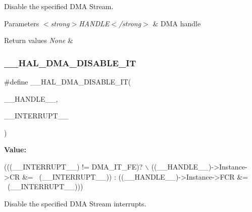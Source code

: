 Disable the specified D\+MA Stream. 


\begin{DoxyParams}{Parameters}
{\em $<$strong$>$\+H\+A\+N\+D\+L\+E$<$/strong$>$} & D\+MA handle \\
\hline
\end{DoxyParams}

\begin{DoxyRetVals}{Return values}
{\em None} & \\
\hline
\end{DoxyRetVals}
\mbox{\label{group___d_m_a_ga2867eab09398df2daac55c3f327654da}} 
\subsubsection{\texorpdfstring{\+\_\+\+\_\+\+H\+A\+L\+\_\+\+D\+M\+A\+\_\+\+D\+I\+S\+A\+B\+L\+E\+\_\+\+IT}{\_\_HAL\_DMA\_DISABLE\_IT}}
{\footnotesize\ttfamily \#define \+\_\+\+\_\+\+H\+A\+L\+\_\+\+D\+M\+A\+\_\+\+D\+I\+S\+A\+B\+L\+E\+\_\+\+IT(\begin{DoxyParamCaption}\item[{}]{\+\_\+\+\_\+\+H\+A\+N\+D\+L\+E\+\_\+\+\_\+,  }\item[{}]{\+\_\+\+\_\+\+I\+N\+T\+E\+R\+R\+U\+P\+T\+\_\+\+\_\+ }\end{DoxyParamCaption})}

{\bfseries Value\+:}
\begin{DoxyCode}
(((\_\_INTERRUPT\_\_) != DMA\_IT\_FE)? \(\backslash\)
((\_\_HANDLE\_\_)->Instance->CR &= ~(\_\_INTERRUPT\_\_)) : ((\_\_HANDLE\_\_)->Instance->FCR &= ~(\_\_INTERRUPT\_\_)))
\end{DoxyCode}


Disable the specified D\+MA Stream interrupts. 


